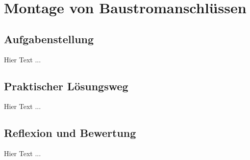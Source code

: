 \chapter{Montage von Baustromanschlüssen}
\label{cha:Baustromanschlüsse}


\section{Aufgabenstellung}

Hier Text ...

\section{Praktischer Lösungsweg}

Hier Text ...

\section{Reflexion und Bewertung}

Hier Text ...

\clearpage
